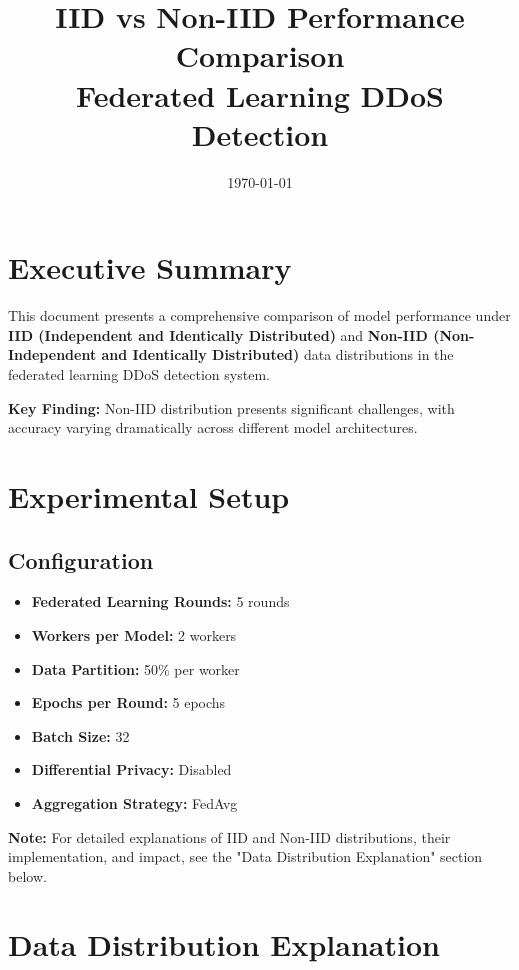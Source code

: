 \documentclass[12pt,a4paper]{article}
\title{IID vs Non-IID Performance Comparison\\Federated Learning DDoS Detection}
\author{}
\date{\today}
\begin{document}
\maketitle

\section{Executive Summary}

This document presents a comprehensive comparison of model performance under \textbf{IID (Independent and Identically Distributed)} and \textbf{Non-IID (Non-Independent and Identically Distributed)} data distributions in the federated learning DDoS detection system.

\textbf{Key Finding:} Non-IID distribution presents significant challenges, with accuracy varying dramatically across different model architectures.

\section{Experimental Setup}

\subsection{Configuration}

\begin{itemize}
    \item \textbf{Federated Learning Rounds:} 5 rounds
    \item \textbf{Workers per Model:} 2 workers
    \item \textbf{Data Partition:} 50\% per worker
    \item \textbf{Epochs per Round:} 5 epochs
    \item \textbf{Batch Size:} 32
    \item \textbf{Differential Privacy:} Disabled
    \item \textbf{Aggregation Strategy:} FedAvg
\end{itemize}

\textbf{Note:} For detailed explanations of IID and Non-IID distributions, their implementation, and impact, see the "Data Distribution Explanation" section below.

\section{Data Distribution Explanation}
\end{document}
